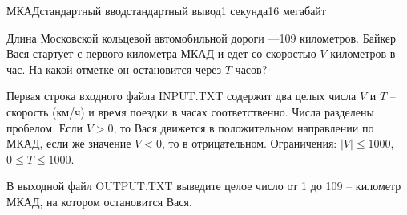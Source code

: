 \begin{problem}{МКАД}{стандартный ввод}{стандартный вывод}{1 секунда}{16 мегабайт}

Длина Московской кольцевой автомобильной дороги ---109 километров. Байкер Вася стартует с первого километра МКАД и едет со скоростью $V$ километров в час. На какой отметке он остановится через $T$ часов?

\InputFile
Первая строка входного файла INPUT.TXT содержит два целых числа $V$ и $T$ -- скорость (км/ч) и время поездки в часах соответственно. Числа разделены пробелом. Если $V>0$, то Вася движется в положительном направлении по МКАД, если же значение $V<0$, то в отрицательном. Ограничения: $|V| \leq 1000$, $0 \leq T \leq 1000$.

\OutputFile
В выходной файл OUTPUT.TXT выведите целое число от 1 до 109 -- километр МКАД, на котором остановится Вася.

\Example

\begin{example}
%
\end{example}

\end{problem}

